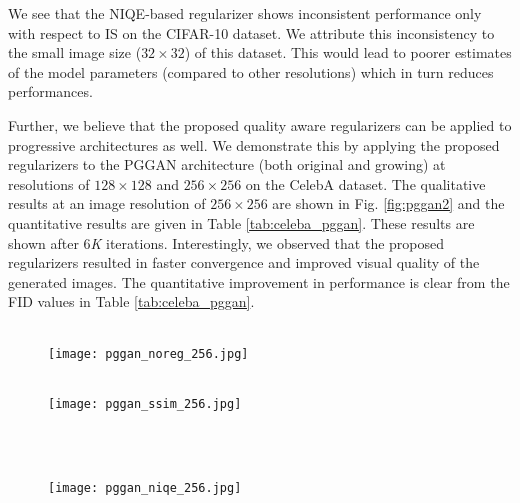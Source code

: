 \documentclass{article}
\begin{document}
We see that the NIQE-based regularizer shows inconsistent performance only with respect to IS on the CIFAR-10 dataset. We attribute this inconsistency to the small image size ($32 \times 32$) of this dataset. This would lead to poorer estimates of the model parameters (compared to other resolutions) which in turn reduces performances.

Further, we believe that the proposed quality aware regularizers can be applied to progressive architectures as well. 
We demonstrate this by applying the proposed regularizers to the PGGAN architecture \cite{karras2018progressive} (both original and growing) at resolutions of $128\times128$ and $256\times256$ on the CelebA dataset. 
The qualitative results at an image resolution of $256 \times 256$ are shown in Fig. \ref{fig:pggan2} and the quantitative results are given in Table \ref{tab:celeba_pggan}. These results are shown after 6{\em{K}} iterations. Interestingly, we observed that the proposed regularizers resulted in faster convergence and improved visual quality of the generated images. The quantitative improvement in performance is clear from the FID values in Table \ref{tab:celeba_pggan}.
\begin{figure*}[htbp]
\begin{subfigure}{\textwidth}
    \centering
    ~\\
\texttt{[image: pggan\_noreg\_256.jpg]}
\end{subfigure}
    \begin{subfigure}{\textwidth}
    \centering
    ~\\
\texttt{[image: pggan\_ssim\_256.jpg]}
\end{subfigure}
    ~\\
\begin{subfigure}{\textwidth}
    \centering
    ~\\
\texttt{[image: pggan\_niqe\_256.jpg]}
\end{subfigure}
    \caption{Randomly sampled images generated using QAGANs for CelebA dataset with a progressively growing architecture ($256 \times 256$) Top row: PGGAN \cite{karras2018progressive}. Middle row: PGGAN with SSIM. Bottom row: PGGAN with NIQE.}
    \label{fig:pggan2}
\end{figure*}
\end{document}
